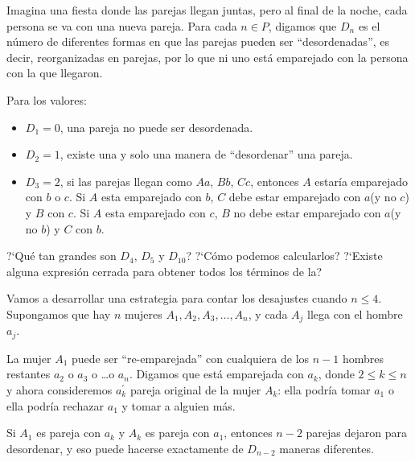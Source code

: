 \begin{example}
	Imagina una fiesta donde las parejas llegan juntas, pero al final de la noche, cada persona se va con una nueva pareja. Para cada $n\in P$, digamos que $D_{n}$ es el número de diferentes formas en que las parejas pueden ser ``desordenadas'', es decir, reorganizadas en parejas, por lo que ni uno está emparejado con la persona con la que llegaron.

	Para los valores:
	\begin{itemize}
		\item $D_{1}=0$, una pareja no puede ser desordenada.
		\item $D_{2} = 1$, existe una y solo una manera de ``desordenar'' una pareja.
		\item $D_{3} = 2$, si las parejas llegan como $Aa$, $Bb$, $Cc$, entonces $A$ estaría emparejado con $b$ o $c$. Si $A$ esta emparejado con $b$, $C$ debe estar emparejado con $a$(y no $c$) y $B$ con $c$. Si $A$ esta emparejado con $c$, $B$ no debe estar emparejado con $a$(y no $b$) y $C$ con $b$.
	\end{itemize}
	?`Qué tan grandes son $D_{4}$, $D_{5}$ y $D_{10}$? ?`Cómo podemos calcularlos? ?`Existe alguna expresión cerrada para obtener todos los términos de la? %

	Vamos a desarrollar una estrategia para contar los desajustes cuando $n\leq4$. Supongamos que hay $n$ mujeres $A_{1},A_{2},A_{3},\ldots,A_{n}$, y cada $A_{j}$ llega con el hombre $a_{j}$.

	La mujer $A_{1}$ puede ser ``re-emparejada'' con cualquiera de los $n-1$ hombres restantes $a_{2}$ o $a_{3}$ o \ldots o $a_{n}$. Digamos que está emparejada con $a_{k}$, donde $2\leq k\leq n$ y ahora consideremos $a_{k}^{\prime}$ pareja original de la mujer $A_{k}$: ella podría tomar $a_{1}$ o ella podría rechazar $a_{1}$ y tomar a alguien más.

	Si $A_{1}$ es pareja con $a_{k}$ y $A_{k}$ es pareja con $a_{1}$, entonces $n-2$ parejas dejaron para desordenar, y eso puede hacerse exactamente de $D_{n-2}$ maneras diferentes.


\end{example}
